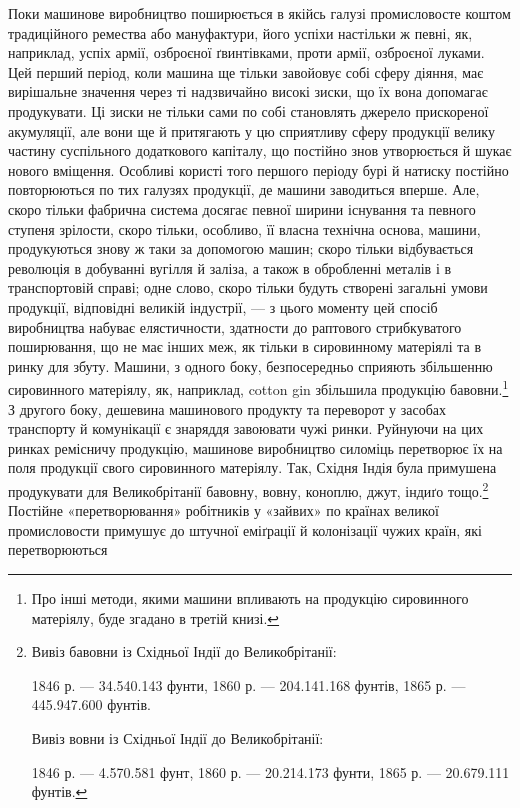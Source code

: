 Поки машинове виробництво поширюється в якійсь галузі промисловосте
коштом традиційного ремества або мануфактури, його
успіхи настільки ж певні, як, наприклад, успіх армії, озброєної
ґвинтівками, проти армії, озброєної луками. Цей перший період,
коли машина ще тільки завойовує собі сферу діяння, має вирішальне
значення через ті надзвичайно високі зиски, що їх вона
допомагає продукувати. Ці зиски не тільки сами по собі становлять
джерело прискореної акумуляції, але вони ще й притягають у
цю сприятливу сферу продукції велику частину суспільного додаткового
капіталу, що постійно знов утворюється й шукає нового
вміщення. Особливі користі того першого періоду бурі й натиску
постійно повторюються по тих галузях продукції, де
машини заводиться вперше. Але, скоро тільки фабрична система
досягає певної ширини існування та певного ступеня зрілости,
скоро тільки, особливо, її власна технічна основа, машини, продукуються
знову ж таки за допомогою машин; скоро тільки відбувається
революція в добуванні вугілля й заліза, а також в обробленні
металів і в транспортовій справі; одне слово, скоро тільки
будуть створені загальні умови продукції, відповідні великій
індустрії, — з цього моменту цей спосіб виробництва набуває елястичности,
здатности до раптового стрибкуватого поширювання, що
не має інших меж, як тільки в сировинному матеріялі та в ринку
для збуту. Машини, з одного боку, безпосередньо сприяють збільшенню
сировинного матеріялу, як, наприклад, cotton gin збільшила
продукцію бавовни.\footnote{
Про інші методи, якими машини впливають на продукцію сировинного
матеріялу, буде згадано в третій книзі.
} З другого боку, дешевина машинового
продукту та переворот у засобах транспорту й комунікації є
знаряддя завоювати чужі ринки. Руйнуючи на цих ринках ремісничу
продукцію, машинове виробництво силоміць перетворює
їх на поля продукції свого сировинного матеріялу. Так, Східня
Індія була примушена продукувати для Великобрітанії бавовну,
вовну, коноплю, джут, індиґо тощо.\footnote{
\noindent{}Вивіз бавовни із Східньої Індії до Великобрітанії:

\noindent{}1846 р. — 34.540.143 фунти, 1860 р. — 204.141.168 фунтів, 1865 р. —
445.947.600 фунтів.

\noindent{}Вивіз вовни із Східньої Індії до Великобрітанії:

\noindent{}1846 р. — 4.570.581 фунт, 1860 р. — 20.214.173 фунти, 1865 р. —
20.679.111 фунтів.
} Постійне «перетворювання»
робітників у «зайвих» по країнах великої промисловости примушує
до штучної еміґрації й колонізації чужих країн, які перетворюються
